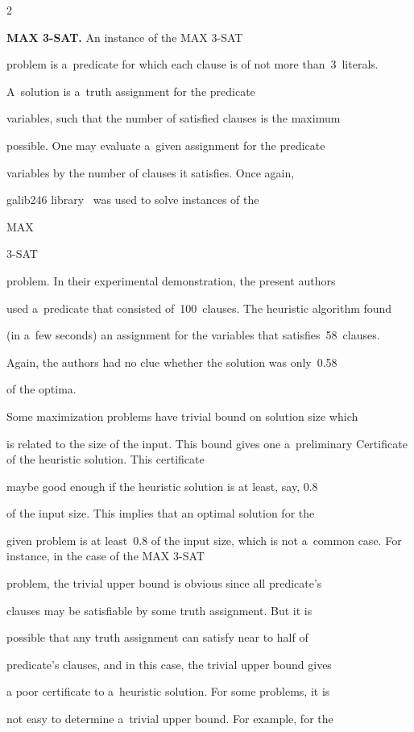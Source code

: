 \begin{multicols}{2}
\noindent


\textbf{MAX 3-SAT.} An instance of the {MAX 3-SAT}


problem is a~predicate for which each clause is of not more than~3~literals.


A~solution is a~truth assignment for the predicate


variables, such that the number of satisfied clauses is the maximum


possible. One may evaluate a~given assignment for the predicate


variables by the number of clauses it satisfies. Once again,


 galib246 library~\cite{GAlib} was used to solve instances of the {MAX


3-SAT} problem. In their experimental demonstration, the present authors


used a~predicate that consisted of~100~clauses. The heuristic algorithm found


(in a~few seconds) an assignment for the variables that satisfies~58~clauses.


Again, the authors had no clue whether the solution was only~0.58


of the optima.





Some maximization problems have trivial bound on solution size which


is related to the size of the input. This bound gives one a~preliminary Certificate of the heuristic solution. This certificate


maybe good enough if the heuristic solution is at least, say, 0.8


of the input size. This implies that an optimal solution for the


given problem is at least~0.8 of the input size, which is not a~common case. For instance, in the case of the {MAX 3-SAT}


problem, the trivial upper bound is obvious since all predicate's


clauses may be satisfiable by some truth assignment. But it is


possible that any truth assignment can satisfy near to half of


predicate's clauses, and in this case, the trivial upper bound gives


a poor certificate to a~heuristic solution. For some problems, it is


not easy to determine a~trivial upper bound. For example, for the



\end{multicols}
